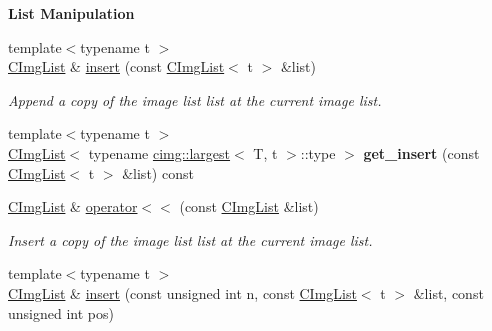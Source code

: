 \begin{Indent}{\bf List Manipulation}
\begin{DoxyCompactItemize}
\item 
\hypertarget{structcimg__library_1_1_c_img_list_ace07ba17687a0b83f17090d5d799f319}{
{\footnotesize template$<$typename t $>$ }\\\hyperlink{structcimg__library_1_1_c_img_list}{CImgList} \& \hyperlink{structcimg__library_1_1_c_img_list_ace07ba17687a0b83f17090d5d799f319}{insert} (const \hyperlink{structcimg__library_1_1_c_img_list}{CImgList}$<$ t $>$ \&list)}
\label{structcimg__library_1_1_c_img_list_ace07ba17687a0b83f17090d5d799f319}

\begin{DoxyCompactList}\small\item\em Append a copy of the image list {\ttfamily list} at the current image list. \item\end{DoxyCompactList}\item 
\hypertarget{structcimg__library_1_1_c_img_list_a0e11891eb3e06538d16072bac980959c}{
{\footnotesize template$<$typename t $>$ }\\\hyperlink{structcimg__library_1_1_c_img_list}{CImgList}$<$ typename \hyperlink{structcimg__library_1_1cimg_1_1largest}{cimg::largest}$<$ T, t $>$::type $>$ {\bfseries get\_\-insert} (const \hyperlink{structcimg__library_1_1_c_img_list}{CImgList}$<$ t $>$ \&list) const }
\label{structcimg__library_1_1_c_img_list_a0e11891eb3e06538d16072bac980959c}

\item 
\hypertarget{structcimg__library_1_1_c_img_list_aa77e46227581bc60971716a994773091}{
\hyperlink{structcimg__library_1_1_c_img_list}{CImgList} \& \hyperlink{structcimg__library_1_1_c_img_list_aa77e46227581bc60971716a994773091}{operator$<$$<$} (const \hyperlink{structcimg__library_1_1_c_img_list}{CImgList} \&list)}
\label{structcimg__library_1_1_c_img_list_aa77e46227581bc60971716a994773091}

\begin{DoxyCompactList}\small\item\em Insert a copy of the image list {\ttfamily list} at the current image list. \item\end{DoxyCompactList}\item 
\hypertarget{structcimg__library_1_1_c_img_list_a2329ffa1657c4376e2360084d44e5446}{
{\footnotesize template$<$typename t $>$ }\\\hyperlink{structcimg__library_1_1_c_img_list}{CImgList} \& \hyperlink{structcimg__library_1_1_c_img_list_a2329ffa1657c4376e2360084d44e5446}{insert} (const unsigned int n, const \hyperlink{structcimg__library_1_1_c_img_list}{CImgList}$<$ t $>$ \&list, const unsigned int pos)}
\label{structcimg__library_1_1_c_img_list_a2329ffa1657c4376e2360084d44e5446}


\end{DoxyCompactItemize}
\end{Indent}
